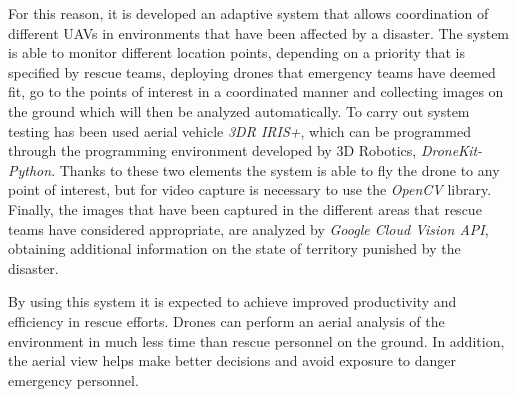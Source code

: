 For this reason, it is developed an adaptive system that allows coordination of different UAVs in environments that have been affected by a disaster. The system is able to monitor different location points, depending on a priority that is specified by rescue teams, deploying drones that emergency teams have deemed fit, go to the points of interest in a coordinated manner and collecting images on the ground which will then be analyzed automatically. To carry out system testing has been used aerial vehicle \textit{3DR IRIS+}, which can be programmed through the programming environment developed by 3D Robotics, \textit{DroneKit-Python}. Thanks to these two elements the system is able to fly the drone to any point of interest, but for video capture is necessary to use the \textit{OpenCV} library. Finally, the images that have been captured in the different areas that rescue teams have considered appropriate, are analyzed by \textit{Google Cloud Vision \acs{API}}, obtaining additional information on the state of territory punished by the disaster.

By using this system it is expected to achieve improved productivity and efficiency in rescue efforts. Drones can perform an aerial analysis of the environment in much less time than rescue personnel on the ground. In addition, the aerial view helps make better decisions and avoid exposure to danger emergency personnel.
